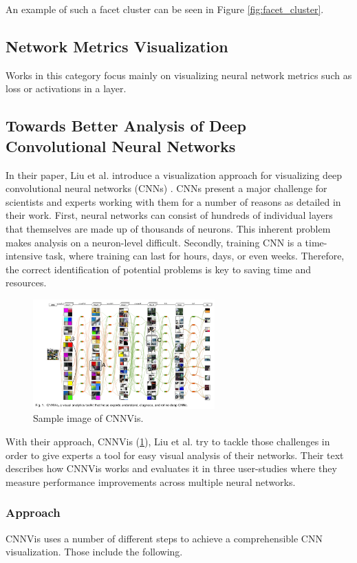 \documentclass{acmsiggraph}               %
\begin{document}
An example of such a facet cluster can be seen in Figure \ref{fig:facet_cluster}.


\subsection{Network Metrics Visualization}
Works in this category focus mainly on visualizing neural network metrics such as loss or activations in a layer.
\subsection{Towards Better Analysis of Deep Convolutional Neural Networks}
In their paper, Liu et al. introduce a  visualization approach for visualizing deep convolutional neural networks (CNNs) \cite{Liu2016}. CNNs present a major challenge for scientists and experts working with them for a number of reasons as detailed in their work. First, neural networks can consist of hundreds of individual layers that themselves are made up of thousands of neurons. This inherent problem makes analysis on a neuron-level difficult. Secondly, training CNN is a time-intensive task, where training can last for hours, days, or even weeks. Therefore, the correct identification of potential problems is key to saving time and resources.\\

\begin{figure}
  \centering
  \includegraphics[width=2.75in]{cnnvis}
  \caption{Sample image of CNNVis. \protect\cite{Liu2016}}
  \label{fig:cnnvis}
\end{figure}

With their approach, CNNVis (\ref{fig:cnnvis}), Liu et al. try to tackle those challenges in order to give experts a tool for easy visual analysis of their networks. Their text describes how CNNVis works and evaluates it in three user-studies where they measure performance improvements across multiple neural networks.\\

\subsubsection{Approach}
CNNVis uses a number of different steps to achieve a comprehensible CNN visualization. Those include the following.
\end{document}

